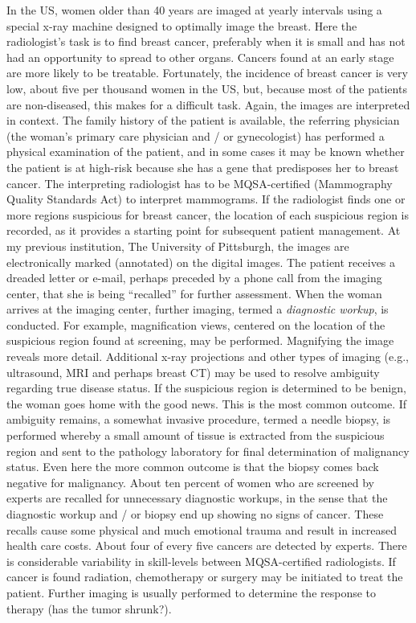 \documentclass[
]{book}
\begin{document}
In the US, women older than 40 years are imaged at yearly intervals using a special x-ray machine designed to optimally image the breast. Here the radiologist's task is to find breast cancer, preferably when it is small and has not had an opportunity to spread to other organs. Cancers found at an early stage are more likely to be treatable. Fortunately, the incidence of breast cancer is very low, about five per thousand women in the US, but, because most of the patients are non-diseased, this makes for a difficult task. Again, the images are interpreted in context. The family history of the patient is available, the referring physician (the woman's primary care physician and / or gynecologist) has performed a physical examination of the patient, and in some cases it may be known whether the patient is at high-risk because she has a gene that predisposes her to breast cancer. The interpreting radiologist has to be MQSA-certified (Mammography Quality Standards Act) to interpret mammograms. If the radiologist finds one or more regions suspicious for breast cancer, the location of each suspicious region is recorded, as it provides a starting point for subsequent patient management. At my previous institution, The University of Pittsburgh, the images are electronically marked (annotated) on the digital images. The patient receives a dreaded letter or e-mail, perhaps preceded by a phone call from the imaging center, that she is being ``recalled'' for further assessment. When the woman arrives at the imaging center, further imaging, termed a \emph{diagnostic workup}, is conducted. For example, magnification views, centered on the location of the suspicious region found at screening, may be performed. Magnifying the image reveals more detail. Additional x-ray projections and other types of imaging (e.g., ultrasound, MRI and perhaps breast CT) may be used to resolve ambiguity regarding true disease status. If the suspicious region is determined to be benign, the woman goes home with the good news. This is the most common outcome. If ambiguity remains, a somewhat invasive procedure, termed a needle biopsy, is performed whereby a small amount of tissue is extracted from the suspicious region and sent to the pathology laboratory for final determination of malignancy status. Even here the more common outcome is that the biopsy comes back negative for malignancy. About ten percent of women who are screened by experts are recalled for unnecessary diagnostic workups, in the sense that the diagnostic workup and / or biopsy end up showing no signs of cancer. These recalls cause some physical and much emotional trauma and result in increased health care costs. About four of every five cancers are detected by experts. There is considerable variability in skill-levels between MQSA-certified radiologists. If cancer is found radiation, chemotherapy or surgery may be initiated to treat the patient. Further imaging is usually performed to determine the response to therapy (has the tumor shrunk?).
\end{document}
